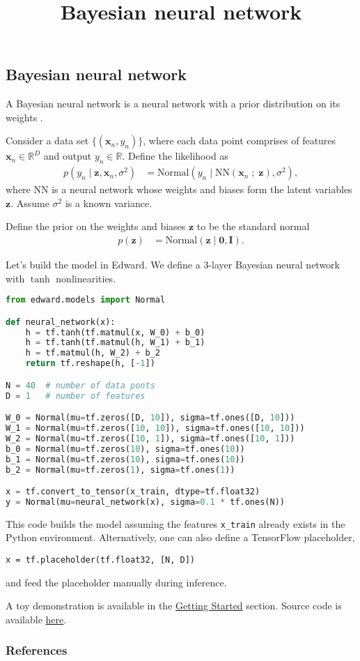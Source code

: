 \title{Bayesian neural network}

\subsection{Bayesian neural network}

A Bayesian neural network is a neural network with a prior
distribution on its weights \citep{neal2012bayesian}.

Consider a data set $\{(\mathbf{x}_n, y_n)\}$, where each data point
comprises of features $\mathbf{x}_n\in\mathbb{R}^D$ and output
$y_n\in\mathbb{R}$. Define the likelihood as
\begin{align*}
  p(y_n \mid \mathbf{z}, \mathbf{x}_n, \sigma^2)
  &=
  \text{Normal}(y_n \mid \mathrm{NN}(\mathbf{x}_n\;;\;\mathbf{z}), \sigma^2),
\end{align*}
where $\mathrm{NN}$ is a neural network whose weights and biases form
the latent variables $\mathbf{z}$. Assume $\sigma^2$ is a
known variance.

Define the prior on the weights and biases $\mathbf{z}$ to be the standard normal
\begin{align*}
  p(\mathbf{z})
  &=
  \text{Normal}(\mathbf{z} \mid \mathbf{0}, \mathbf{I}).
\end{align*}

Let's build the model in Edward. We define a 3-layer Bayesian neural
network with $\tanh$ nonlinearities.
\begin{lstlisting}[language=Python]
from edward.models import Normal

def neural_network(x):
    h = tf.tanh(tf.matmul(x, W_0) + b_0)
    h = tf.tanh(tf.matmul(h, W_1) + b_1)
    h = tf.matmul(h, W_2) + b_2
    return tf.reshape(h, [-1])

N = 40  # number of data ponts
D = 1   # number of features

W_0 = Normal(mu=tf.zeros([D, 10]), sigma=tf.ones([D, 10]))
W_1 = Normal(mu=tf.zeros([10, 10]), sigma=tf.ones([10, 10]))
W_2 = Normal(mu=tf.zeros([10, 1]), sigma=tf.ones([10, 1]))
b_0 = Normal(mu=tf.zeros(10), sigma=tf.ones(10))
b_1 = Normal(mu=tf.zeros(10), sigma=tf.ones(10))
b_2 = Normal(mu=tf.zeros(1), sigma=tf.ones(1))

x = tf.convert_to_tensor(x_train, dtype=tf.float32)
y = Normal(mu=neural_network(x), sigma=0.1 * tf.ones(N))
\end{lstlisting}
This code builds the model assuming the features \texttt{x\_train}
already exists in the Python environment. Alternatively, one can also
define a TensorFlow placeholder,
\begin{lstlisting}
x = tf.placeholder(tf.float32, [N, D])
\end{lstlisting}
and feed the placeholder manually during inference.

A toy demonstration is available in the \href{/getting-started}{Getting Started} section.
Source code is available
\href{https://github.com/blei-lab/edward/blob/master/examples/bayesian_nn.py}
{here}.

\subsubsection{References}\label{references}
